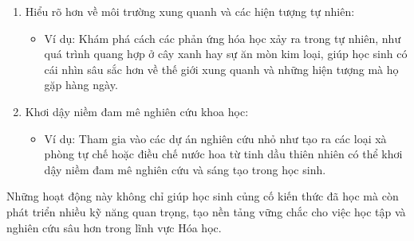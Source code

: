 \documentclass[Main.tex]{subfiles}
\begin{document}
\begin{bt}
{\begin{enumerate}
\begin{itemize}
			\end{itemize}
			\item  Hiểu rõ hơn về môi trường xung quanh và các hiện tượng tự nhiên:
			\begin{itemize}
				\item  Ví dụ: Khám phá cách các phản ứng hóa học xảy ra trong tự nhiên, như quá trình quang hợp ở cây xanh hay sự ăn mòn kim loại, giúp học sinh có cái nhìn sâu sắc hơn về thế giới xung quanh và những hiện tượng mà họ gặp hàng ngày.
			\end{itemize}
			\item  Khơi dậy niềm đam mê nghiên cứu khoa học:
		\begin{itemize}
			\item  Ví dụ: Tham gia vào các dự án nghiên cứu nhỏ như tạo ra các loại xà phòng tự chế hoặc điều chế nước hoa từ tinh dầu thiên nhiên có thể khơi dậy niềm đam mê nghiên cứu và sáng tạo trong học sinh.
		\end{itemize}
	\end{enumerate}
		Những hoạt động này không chỉ giúp học sinh củng cố kiến thức đã học mà còn phát triển nhiều kỹ năng quan trọng, tạo nền tảng vững chắc cho việc học tập và nghiên cứu sâu hơn trong lĩnh vực Hóa học.
		}
	\end{bt}
	
\end{document}
